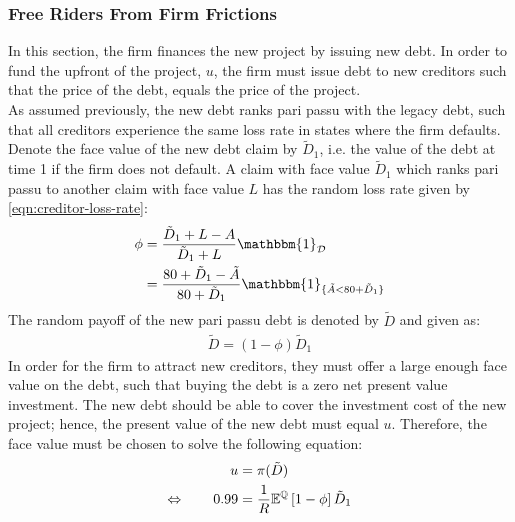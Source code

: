 \documentclass[main.tex]{subfiles}
\begin{document}
    \subsubsection{Free Riders From Firm Frictions}
    \label{sec:example-risk-free-project-debt-issuance}
        In this section, the firm finances the new project by issuing new debt.
        In order to fund the upfront of the project, $u$, 
        the firm must issue debt to new creditors such that the price of the debt, 
        equals the price of the project.
        \\
        As assumed previously, the new debt ranks pari passu with the legacy debt, 
        such that all creditors experience the same loss rate in states where the firm defaults.
        Denote the face value of the new debt claim by $\tilde{D}_{1}$, 
        i.e. the value of the debt at time 1 if the firm does not default. 
        A claim with face value $\tilde{D}_{1}$ which ranks pari passu to another claim 
        with face value $L$ has the random loss rate given by \cref{eqn:creditor-loss-rate}:
            \begin{align*}
                \phi
                &=
                    \frac{
                        \tilde{D}_{1} + L - A
                    }{
                        \tilde{D}_{1} + L
                    }
                    \mathbbm{1}_{\mathcal{D}}
                \nonumber \\
                &=
                    \frac{
                        \num{80} + \tilde{D}_{1} - \tilde{A}
                    }{
                        \num{80} + \tilde{D}_{1}
                    }
                    \mathbbm{1}_{\{\tilde{A} < \num{80} + \tilde{D}_{1}\}} 
            \end{align*}
        The random payoff of the new pari passu debt is denoted by $\tilde{D}$ and given as:
            \begin{align*}
                \tilde{D}
                    = (1 - \phi)\tilde{D}_{1}
            \end{align*}
        In order for the firm to attract new creditors,
        they must offer a large enough face value on the debt, 
        such that buying the debt is a zero net present value investment.
        The new debt should be able to cover the investment cost of the new project;
        hence, the present value of the new debt must equal $u$.
        Therefore, the face value must be chosen to solve the following equation:
            \begin{align*}
                u &= \pi(\tilde{D}) \\
                \Leftrightarrow  \qquad
                \num{0.99} 
                &= 
                    \frac{1}{R}
                    \mathbb{E}^{\mathbb{Q}}\left[
                        1 - \phi
                    \right] 
                    \tilde{D}_{1}
            \end{align*}
\end{document}
